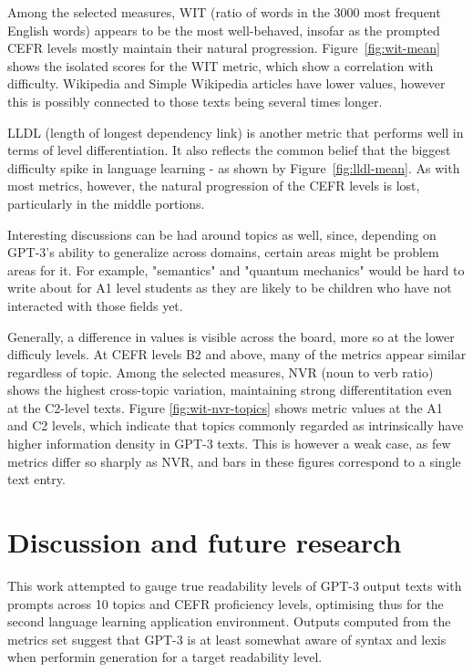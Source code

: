 \documentclass[11pt]{article}
\begin{document}
Among the selected measures, WIT (ratio of words in the 3000 most frequent English words) appears to be the most well-behaved, insofar as the prompted CEFR levels mostly maintain their natural progression. Figure~\ref{fig:wit-mean} shows the isolated scores for the WIT metric, which show a correlation with difficulty. Wikipedia and Simple Wikipedia articles have lower values, however this is possibly connected to those texts being several times longer.



LLDL (length of longest dependency link) is another metric that performs well in terms of level differentiation. It also reflects the common belief that the biggest difficulty spike in language learning - as shown by Figure~\ref{fig:lldl-mean}. As with most metrics, however, the natural progression of the CEFR levels is lost, particularly in the middle portions.

Interesting discussions can be had around topics as well, since, depending on GPT-3's ability to generalize across domains, certain areas might be problem areas for it. For example, "semantics" and "quantum mechanics" would be hard to write about for A1 level students as they are likely to be children who have not interacted with those fields yet.

Generally, a difference in values is visible across the board, more so at the lower difficuly levels. At CEFR levels B2 and above, many of the metrics appear similar regardless of topic. Among the selected measures, NVR (noun to verb ratio) shows the highest cross-topic variation, maintaining strong differentitation even at the C2-level texts. Figure \ref{fig:wit-nvr-topics} shows metric values at the A1 and C2 levels, which indicate that topics commonly regarded as intrinsically have higher information density in GPT-3 texts. This is however a weak case, as few metrics differ so sharply as NVR, and bars in these figures correspond to a single text entry.



\section{Discussion and future research}

This work attempted to gauge true readability levels of GPT-3 output texts with prompts across 10 topics and CEFR proficiency levels, optimising thus for the second language learning application environment. Outputs computed from the metrics set suggest that GPT-3 is at least somewhat aware of syntax and lexis when performin generation for a target readability level.
\end{document}
